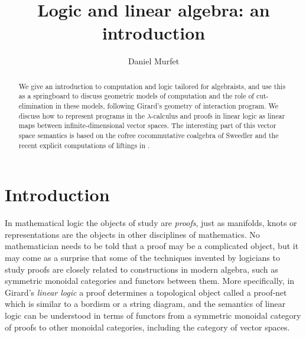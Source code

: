 \documentclass[english,letter paper,12pt,reqno]{article}
\theoremstyle{example}
\numberwithin{equation}{section}
\def\res{\operatorname{Res}}
\begin{document}
\def\ScoreOverhang{1pt}

\def\Res{\res\!}
\newcommand{\ud}[1]{\operatorname{d}\!{#1}}
\newcommand{\Ress}[1]{\res_{#1}\!}
\newcommand{\cat}[1]{\mathcal{#1}}
\newcommand{\lto}{\longrightarrow}
\newcommand{\xlto}[1]{\stackrel{#1}\lto}
\newcommand{\mf}[1]{\mathfrak{#1}}
\newcommand{\md}[1]{\mathscr{#1}}
\newcommand{\church}[1]{\underline{#1}}
\newcommand{\prf}[1]{\underline{#1}}
\newcommand{\den}[1]{\llbracket #1 \rrbracket}
\def\l{\,|\,}
\def\sgn{\textup{sgn}}
\def\cont{\operatorname{cont}}

\title{Logic and linear algebra: an introduction}
\author{Daniel Murfet}

\maketitle

\begin{abstract} We give an introduction to computation and logic tailored for algebraists, and use this as a springboard to discuss geometric models of computation and the role of cut-elimination in these models, following Girard's geometry of interaction program. We discuss how to represent programs in the $\lambda$-calculus and proofs in linear logic as linear maps between infinite-dimensional vector spaces. The interesting part of this vector space semantics is based on the cofree cocommutative coalgebra of Sweedler \cite{sweedler} and the recent explicit computations of liftings in \cite{murfet_coalg}.
\end{abstract}

\section{Introduction}

In mathematical logic the objects of study are \emph{proofs}, just as manifolds, knots or representations are the objects in other disciplines of mathematics. No mathematician needs to be told that a proof may be a complicated object, but it may come as a surprise that some of the techniques invented by logicians to study proofs are closely related to constructions in modern algebra, such as symmetric monoidal categories and functors between them. More specifically, in Girard's \emph{linear logic} \cite{girard_llogic} a proof determines a topological object called a proof-net which is similar to a bordism or a string diagram, and the semantics of linear logic \cite{mellies} can be understood in terms of functors from a symmetric monoidal category of proofs to other monoidal categories, including the category of vector spaces.
\end{document}
